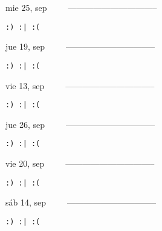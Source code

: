 \documentclass[letterpaper,10pt]{article}
\begin{document}
\begin{multicols}{3}
{mie 25, sep\ \ \ \ \ --------------------------------}
\begin{flushright}\begin{small}\texttt{:) :| :(}\end{small}\end{flushright}
\vfill
{jue 19, sep\ \ \ \ \ --------------------------------}
\begin{flushright}\begin{small}\texttt{:) :| :(}\end{small}\end{flushright}\par
\vfill
{vie 13, sep\ \ \ \ \ --------------------------------}
\begin{flushright}\begin{small}\texttt{:) :| :(}\end{small}\end{flushright}\par
\vfill
\end{multicols}
\vspace{1.05cm}

\begin{multicols}{3}
{jue 26, sep\ \ \ \ \ --------------------------------}
\begin{flushright}\begin{small}\texttt{:) :| :(}\end{small}\end{flushright}
\vfill
{vie 20, sep\ \ \ \ \ --------------------------------}
\begin{flushright}\begin{small}\texttt{:) :| :(}\end{small}\end{flushright}\par
\vfill
{sáb 14, sep\ \ \ \ \ --------------------------------}
\begin{flushright}\begin{small}\texttt{:) :| :(}\end{small}\end{flushright}\par
\vfill
\end{multicols}
\vspace{1.05cm}
\end{document}
